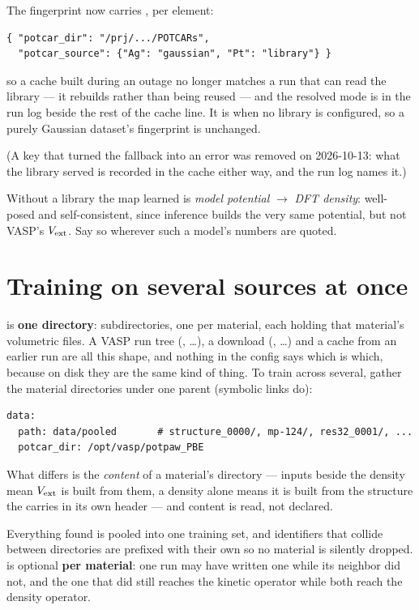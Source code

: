 The fingerprint now carries , per element:

\begin{lstlisting}
{ "potcar_dir": "/prj/.../POTCARs",
  "potcar_source": {"Ag": "gaussian", "Pt": "library"} }
\end{lstlisting}

so a cache built during an outage no longer matches a run that can read the
library --- it rebuilds rather than being reused --- and the resolved mode is
in the run log beside the rest of the cache line. It is  when no
library is configured, so a purely Gaussian dataset's fingerprint is unchanged.

(A  key that turned the fallback into an error was
removed on 2026-10-13: what the library served is recorded in the cache
either way, and the run log names it.)

Without a library the map learned is \emph{model potential} $\to$ \emph{DFT
density}: well-posed and self-consistent, since inference builds the very same
potential, but not VASP's $V_{\mathrm{ext}}$. Say so wherever such a model's numbers are
quoted.

\section{Training on several sources at once}

 is \textbf{one directory}: subdirectories, one per material,
each holding that material's volumetric files. A VASP run tree
(, \ldots), a download (, \ldots) and a
cache from an earlier run are all this shape, and nothing in the config says
which is which, because on disk they are the same kind of thing. To train across
several, gather the material directories under one parent (symbolic links do):

\begin{lstlisting}
data:
  path: data/pooled       # structure_0000/, mp-124/, res32_0001/, ...
  potcar_dir: /opt/vasp/potpaw_PBE
\end{lstlisting}

What differs is the \emph{content} of a material's directory --- inputs beside
the density mean $V_{\mathrm{ext}}$ is built from them, a density alone means it is built
from the structure the  carries in its own header --- and content
is read, not declared.

Everything found is pooled into one training set, and identifiers that collide
between directories are prefixed with their own so no material is silently
dropped.  is optional \textbf{per material}: one run may have
written one while its neighbor did not, and the one that did still reaches
the kinetic operator while both reach the density operator.

